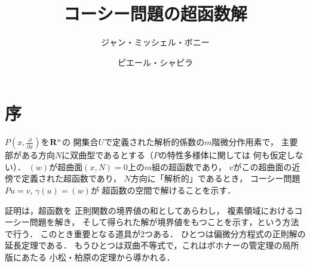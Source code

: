 \theoremstyle{mystyle}
\newtheorem{AXM}{公理}[section]
\newtheorem{DFN}{定義}
\newtheorem{THM}[Axiom]{定理}
\newtheorem*{THM*}{定理}
\newtheorem{PRP}{命題}
\newtheorem{LMM}[Axiom]{補題}
\newtheorem{CRL}{系}
\newtheorem*{CRL*}{系}
\newtheorem{EG}[Axiom]{例}
\newtheorem{CNV}[Axiom]{規約}
\newtheorem{NTN}[Axiom]{記号}
\newtheorem*{NTN*}{記号}
\newtheorem{CMT}{コメント}
\newtheorem{RMK}{注意}
\newtheorem*{RMK*}{注意}






\def\inner<#1>{\langle #1 \rangle}








\title{コーシー問題の超函数解}
\author{ジャン・ミッシェル・ボニー\and ピエール・シャピラ}
\date{}

\maketitle
\setcounter{section}{-1}
\section{序}
\(P\left(x,\frac{\partial}{\partial x}\right)\)を\(\mathbf{R}^n\)の
開集合\(U\)で定義された解析的係数の\(m\)階微分作用素で，
主要部がある方向\(N\)に双曲型であるとする（\(P\)の特性多様体に関しては
何も仮定しない）．
\((w)\)が超曲面$(x, N) = 0$上の\(m\)組の超函数であり，
\(v\)がこの超曲面の近傍で定義された超函数であり，
\(N\)方向に「解析的」であるとき，
コーシー問題$Pu = v$, $\gamma(u) = (w)$が
超函数の空間で解けることを示す．

証明は，超函数を
正則関数の境界値の和としてあらわし，
複素領域におけるコーシー問題を解き，
そして得られた解が境界値をもつことを示す，という方法で行う．
このとき重要となる道具が2つある．
ひとつは偏微分方程式の正則解の延長定理である．
もうひとつは双曲不等式で，これはボホナーの管定理の局所版にあたる
小松・柏原の定理から導かれる．

